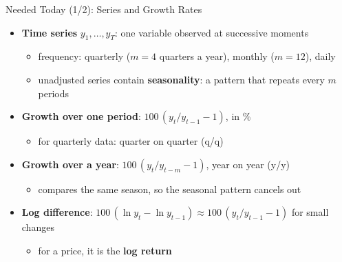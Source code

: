 \begin{frame}{Needed Today (1/2): Series and Growth Rates}
\itemsize{\small}
\begin{itemize}
    \item \textbf{Time series} $y_1, \ldots, y_T$: one variable observed at successive moments
    \begin{itemize}
        \item frequency: quarterly ($m = 4$ quarters a year), monthly ($m = 12$), daily
        \item unadjusted series contain \textbf{seasonality}: a pattern that repeats every $m$ periods
    \end{itemize}
    \item \textbf{Growth over one period}: $100\,(y_t / y_{t-1} - 1)$, in \%
    \begin{itemize}
        \item for quarterly data: quarter on quarter (q/q)
    \end{itemize}
    \item \textbf{Growth over a year}: $100\,(y_t / y_{t-m} - 1)$, year on year (y/y)
    \begin{itemize}
        \item compares the same season, so the seasonal pattern cancels out
    \end{itemize}
    \item \textbf{Log difference}: $100\,(\ln y_t - \ln y_{t-1}) \approx 100\,(y_t / y_{t-1} - 1)$ for small changes
    \begin{itemize}
        \item for a price, it is the \textbf{log return}
    \end{itemize}
\end{itemize}
\end{frame}

